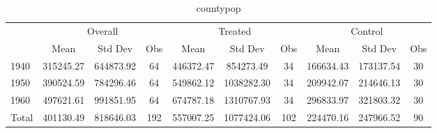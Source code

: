 \begin{table}[htbp]\centering
\def\sym#1{\ifmmode^{#1}\else\(^{#1}\)\fi}
\caption{countypop \label{tab1}}
\begin{tabular}{l*{3}{ccc}}
\toprule
                    &\multicolumn{3}{c}{Overall}           &\multicolumn{3}{c}{Treated}           &\multicolumn{3}{c}{Control}           \\
                    &        Mean&     Std Dev&         Obs&        Mean&     Std Dev&         Obs&        Mean&     Std Dev&         Obs\\
\midrule
1940                &   315245.27&   644873.92&          64&   446372.47&   854273.49&          34&   166634.43&   173137.54&          30\\
1950                &   390524.59&   784296.46&          64&   549862.12&  1038282.30&          34&   209942.07&   214646.13&          30\\
1960                &   497621.61&   991851.95&          64&   674787.18&  1310767.93&          34&   296833.97&   321803.32&          30\\
Total               &   401130.49&   818646.03&         192&   557007.25&  1077424.06&         102&   224470.16&   247966.52&          90\\
\bottomrule
\end{tabular}
\end{table}

